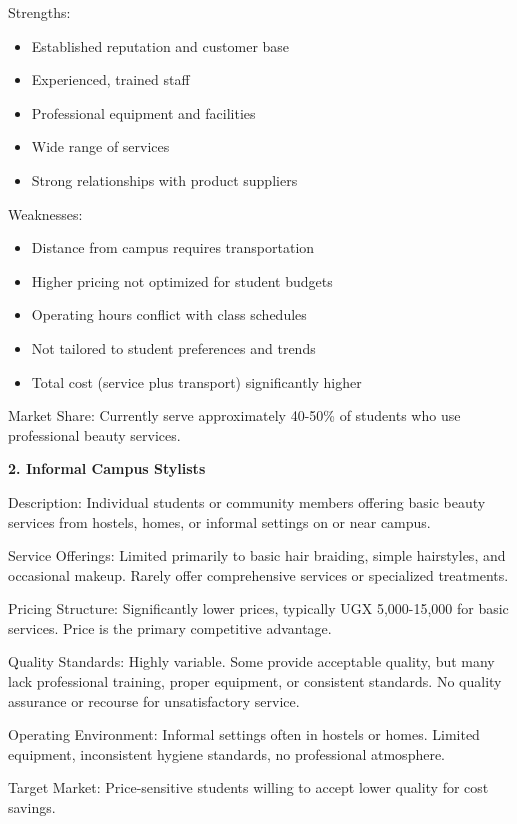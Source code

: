 \documentclass[a4paper,12pt]{article}
\begin{document}
Strengths:
\begin{itemize}[leftmargin=2em]
    \item Established reputation and customer base
    \item Experienced, trained staff
    \item Professional equipment and facilities
    \item Wide range of services
    \item Strong relationships with product suppliers
\end{itemize}

Weaknesses:
\begin{itemize}[leftmargin=2em]
    \item Distance from campus requires transportation
    \item Higher pricing not optimized for student budgets
    \item Operating hours conflict with class schedules
    \item Not tailored to student preferences and trends
    \item Total cost (service plus transport) significantly higher
\end{itemize}

Market Share: Currently serve approximately 40-50\% of students who use professional beauty services.

\textbf{2. Informal Campus Stylists}

Description: Individual students or community members offering basic beauty services from hostels, homes, or informal settings on or near campus.

Service Offerings: Limited primarily to basic hair braiding, simple hairstyles, and occasional makeup. Rarely offer comprehensive services or specialized treatments.

Pricing Structure: Significantly lower prices, typically UGX 5,000-15,000 for basic services. Price is the primary competitive advantage.

Quality Standards: Highly variable. Some provide acceptable quality, but many lack professional training, proper equipment, or consistent standards. No quality assurance or recourse for unsatisfactory service.

Operating Environment: Informal settings often in hostels or homes. Limited equipment, inconsistent hygiene standards, no professional atmosphere.

Target Market: Price-sensitive students willing to accept lower quality for cost savings.
\end{document}
